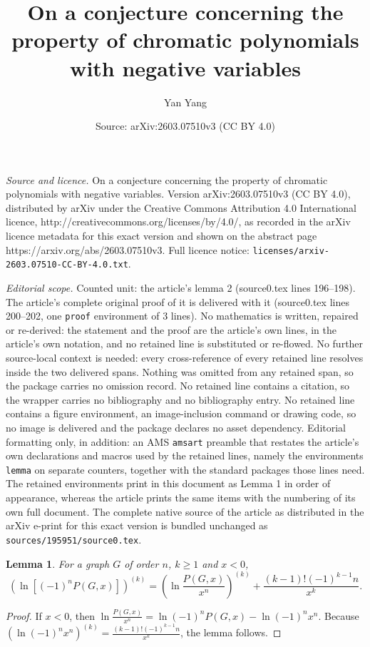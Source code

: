 \documentclass[10pt,a4paper]{amsart}
\title{On a conjecture concerning the property of chromatic polynomials with negative variables}
\author{Yan Yang}
\date{Source: arXiv:2603.07510v3 (CC BY 4.0)}
\newtheorem{lemma}{Lemma}
\begin{document}
\maketitle

\noindent\emph{Source and licence.} On a conjecture concerning the property of chromatic polynomials with negative variables. Version arXiv:2603.07510v3 (CC BY 4.0), distributed by arXiv under the Creative Commons Attribution 4.0 International licence, http://creativecommons.org/licenses/by/4.0/, as recorded in the arXiv licence metadata for this exact version and shown on the abstract page https://arxiv.org/abs/2603.07510v3. Full licence notice: \texttt{licenses/arxiv-2603.07510-CC-BY-4.0.txt}.\par\smallskip

\noindent\textit{Editorial scope.} Counted unit: the article's lemma 2 (source0.tex lines 196--198). The article's complete original proof of it is delivered with it (source0.tex lines 200--202, one \texttt{proof} environment of 3 lines). No mathematics is written, repaired or re-derived: the statement and the proof are the article's own lines, in the article's own notation, and no retained line is substituted or re-flowed.  No further source-local context is needed: every cross-reference of every retained line resolves inside the two delivered spans.  Nothing was omitted from any retained span, so the package carries no omission record.  No retained line contains a citation, so the wrapper carries no bibliography and no bibliography entry.  No retained line contains a figure environment, an image-inclusion command or drawing code, so no image is delivered and the package declares no asset dependency.  Editorial formatting only, in addition: an AMS \texttt{amsart} preamble that restates the article's own declarations and macros used by the retained lines, namely the environments \texttt{lemma} on separate counters, together with the standard packages those lines need.  The retained environments print in this document as Lemma 1 in order of appearance, whereas the article prints the same items with the numbering of its own full document.  The complete native source of the article as distributed in the arXiv e-print for this exact version is bundled unchanged as \texttt{sources/195951/source0.tex}.
\begin{lemma}\label{2} For a graph $G$ of order $n$, $k\geq 1$ and $x<0$,
\[(\ln[(-1)^n P(G, x)])^{(k)}=(\ln\frac{P(G,x)}{x^n})^{(k)}+\frac{(k-1)!(-1)^{k-1}n}{x^{k}}. \]
\end{lemma}

\begin{proof} If $x<0$, then $\ln\frac{P(G,x)}{x^n}=\ln(-1)^nP(G,x)-\ln(-1)^nx^n$.
Because $(\ln(-1)^nx^n)^{(k)}=\frac{(k-1)!(-1)^{k-1}n}{x^{k}}$, the lemma follows.
\end{proof}
\end{document}
